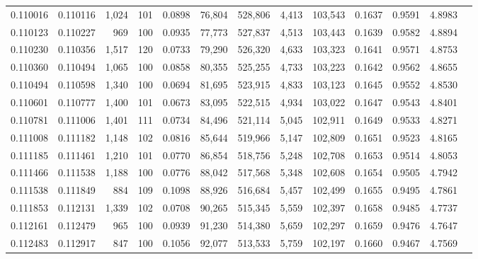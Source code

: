 \begin{tabular}{rrrrrrrrrrrrr}
0.110016 & 0.110116 & 1,024 & 101 &                                     0.0898 &  76,804 & 528,806 &   4,413 & 103,543 & 0.1637 & 0.9591 & 4.8983 \\
0.110123 & 0.110227 &   969 & 100 &                                     0.0935 &  77,773 & 527,837 &   4,513 & 103,443 & 0.1639 & 0.9582 & 4.8894 \\
0.110230 & 0.110356 & 1,517 & 120 &                                     0.0733 &  79,290 & 526,320 &   4,633 & 103,323 & 0.1641 & 0.9571 & 4.8753 \\
0.110360 & 0.110494 & 1,065 & 100 &                                     0.0858 &  80,355 & 525,255 &   4,733 & 103,223 & 0.1642 & 0.9562 & 4.8655 \\
0.110494 & 0.110598 & 1,340 & 100 &                                     0.0694 &  81,695 & 523,915 &   4,833 & 103,123 & 0.1645 & 0.9552 & 4.8530 \\
0.110601 & 0.110777 & 1,400 & 101 &                                     0.0673 &  83,095 & 522,515 &   4,934 & 103,022 & 0.1647 & 0.9543 & 4.8401 \\
0.110781 & 0.111006 & 1,401 & 111 &                                     0.0734 &  84,496 & 521,114 &   5,045 & 102,911 & 0.1649 & 0.9533 & 4.8271 \\
0.111008 & 0.111182 & 1,148 & 102 &                                     0.0816 &  85,644 & 519,966 &   5,147 & 102,809 & 0.1651 & 0.9523 & 4.8165 \\
0.111185 & 0.111461 & 1,210 & 101 &                                     0.0770 &  86,854 & 518,756 &   5,248 & 102,708 & 0.1653 & 0.9514 & 4.8053 \\
0.111466 & 0.111538 & 1,188 & 100 &                                     0.0776 &  88,042 & 517,568 &   5,348 & 102,608 & 0.1654 & 0.9505 & 4.7942 \\
0.111538 & 0.111849 &   884 & 109 &                                     0.1098 &  88,926 & 516,684 &   5,457 & 102,499 & 0.1655 & 0.9495 & 4.7861 \\
0.111853 & 0.112131 & 1,339 & 102 &                                     0.0708 &  90,265 & 515,345 &   5,559 & 102,397 & 0.1658 & 0.9485 & 4.7737 \\
0.112161 & 0.112479 &   965 & 100 &                                     0.0939 &  91,230 & 514,380 &   5,659 & 102,297 & 0.1659 & 0.9476 & 4.7647 \\
0.112483 & 0.112917 &   847 & 100 &                                     0.1056 &  92,077 & 513,533 &   5,759 & 102,197 & 0.1660 & 0.9467 & 4.7569 \\

\end{tabular}
